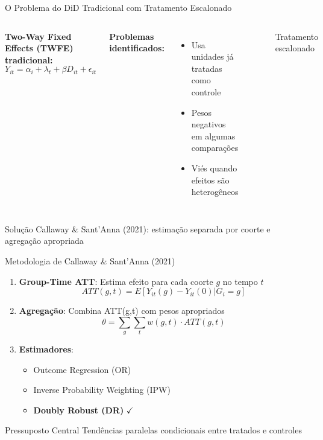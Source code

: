 \documentclass[10pt,aspectratio=169]{beamer}
\begin{document}
\begin{frame}{O Problema do DiD Tradicional com Tratamento Escalonado}
\begin{columns}
\textbf{Two-Way Fixed Effects (TWFE) tradicional:}
$$Y_{it} = \alpha_i + \lambda_t + \beta D_{it} + \epsilon_{it}$$

\textbf{Problemas identificados:}
\begin{itemize}
    \item Usa unidades já tratadas como controle
    \item Pesos negativos em algumas comparações
    \item Viés quando efeitos são heterogêneos
\end{itemize}

\begin{figure}
\centering
{}
\caption*{Tratamento escalonado}
\end{figure}
\end{columns}

\vspace{0.3cm}
\begin{alertblock}{Solução}
Callaway \& Sant'Anna (2021): estimação separada por coorte e agregação apropriada
\end{alertblock}
\end{frame}

\begin{frame}{Metodologia de Callaway \& Sant'Anna (2021)}
\begin{enumerate}
    \item \textbf{Group-Time ATT}: Estima efeito para cada coorte $g$ no tempo $t$
    $$ATT(g,t) = E[Y_{it}(g) - Y_{it}(0) | G_i = g]$$
    
    \item \textbf{Agregação}: Combina ATT(g,t) com pesos apropriados
    $$\theta = \sum_{g} \sum_{t} w(g,t) \cdot ATT(g,t)$$
    
    \item \textbf{Estimadores}:
    \begin{itemize}
        \item Outcome Regression (OR)
        \item Inverse Probability Weighting (IPW)
        \item \textbf{Doubly Robust (DR)} $\checkmark$
    \end{itemize}
\end{enumerate}

\begin{block}{Pressuposto Central}
Tendências paralelas condicionais entre tratados e controles
\end{block}
\end{frame}
\end{document}
